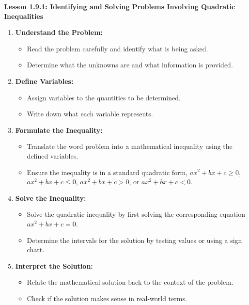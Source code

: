 \begin{center}
\textbf{Lesson 1.9.1: Identifying and Solving Problems Involving Quadratic Inequalities}
\end{center}


\begin{enumerate}
    \item \textbf{Understand the Problem:}
    \begin{itemize}
        \item Read the problem carefully and identify what is being asked.
        \item Determine what the unknowns are and what information is provided.
    \end{itemize}
    
    \item \textbf{Define Variables:}
    \begin{itemize}
        \item Assign variables to the quantities to be determined.
        \item Write down what each variable represents.
    \end{itemize}
    
    \item \textbf{Formulate the Inequality:}
    \begin{itemize}
        \item Translate the word problem into a mathematical inequality using the defined variables.
        \item Ensure the inequality is in a standard quadratic form, \(ax^2 + bx + c \geq 0\), \(ax^2 + bx + c \leq 0\), \(ax^2 + bx + c > 0\), or \(ax^2 + bx + c < 0\).
    \end{itemize}
    
    \item \textbf{Solve the Inequality:}
    \begin{itemize}
        \item Solve the quadratic inequality by first solving the corresponding equation \(ax^2 + bx + c = 0\).
        \item Determine the intervals for the solution by testing values or using a sign chart.
    \end{itemize}
    
    \item \textbf{Interpret the Solution:}
    \begin{itemize}
        \item Relate the mathematical solution back to the context of the problem.
        \item Check if the solution makes sense in real-world terms.
    \end{itemize}
\end{enumerate}

